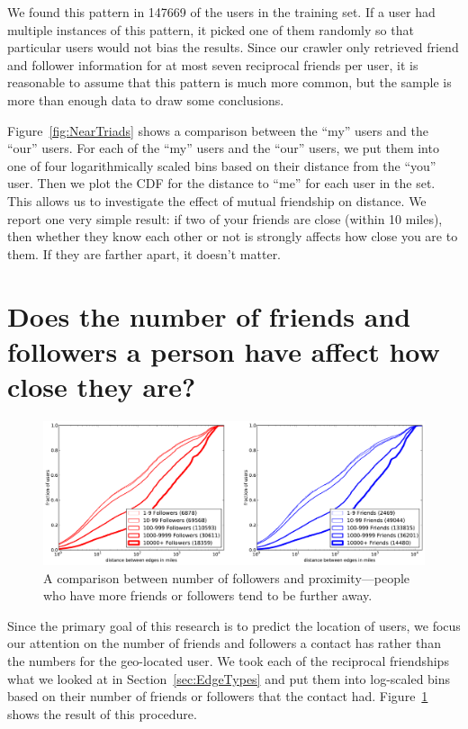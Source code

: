 We found this pattern in 147669 of the users in the training set.
If a user had multiple instances of this pattern, it picked one of them
randomly so that particular users would not bias the results.
Since our crawler only retrieved friend and follower information for at most
seven reciprocal friends per user, it is reasonable to assume that this pattern
is much more common, but the sample is more than enough data to draw some
conclusions.

Figure~\ref{fig:NearTriads} shows a comparison between the ``my'' users and the
``our'' users.
For each of the ``my'' users and the ``our'' users, we put them into one of
four logarithmically scaled bins based on their distance from the ``you'' user.
Then we plot the CDF for the distance to ``me'' for each user in the set. This
allows us to investigate the effect of mutual friendship on distance.
We report one very simple result: if two of your friends are close (within 10
miles), then whether they know each other or not is strongly affects how close
you are to them. If they are farther apart, it doesn't matter.

\section{Does the number of friends and followers a person have affect how
close they are?}

\begin{figure}[tb]
\centering
\includegraphics[width=\linewidth]{figures/edge_counts.pdf}
\caption{
A comparison between number of followers and proximity---people who have more
friends or followers tend to be further away.
}
\label{fig:EdgeCounts}
\end{figure}


Since the primary goal of this research is to predict the location of users, we
focus our attention on the number of friends and followers a contact has rather
than the numbers for the geo-located user.
We took each of the reciprocal friendships what we looked at in
Section~\ref{sec:EdgeTypes} and put them into log-scaled bins based on their
number of friends or followers that the contact had.
Figure~\ref{fig:EdgeCounts} shows the result of this procedure.

